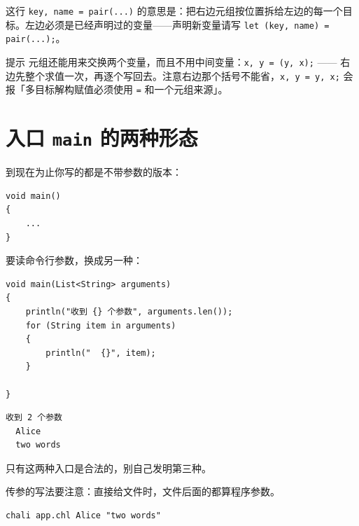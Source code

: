 这行 \texttt{key,\allowbreak{} name =\allowbreak{} pair(\allowbreak{}.\allowbreak{}.\allowbreak{}.\allowbreak{})\allowbreak{}} 的意思是：把右边元组按位置拆给左边的每一个目标。左边必须是已经声明过的变量——声明新变量请写 \texttt{let (\allowbreak{}key,\allowbreak{} name)\allowbreak{} =\allowbreak{} pair(\allowbreak{}.\allowbreak{}.\allowbreak{}.\allowbreak{})\allowbreak{};}。

\begin{tip}{提示}
元组还能用来交换两个变量，而且不用中间变量：\texttt{x,\allowbreak{} y =\allowbreak{} (\allowbreak{}y,\allowbreak{} x)\allowbreak{};} —— 右边先整个求值一次，再逐个写回去。注意右边那个括号不能省，\texttt{x,\allowbreak{} y =\allowbreak{} y,\allowbreak{} x;} 会报「多目标解构赋值必须使用 \texttt{=\allowbreak{}} 和一个元组来源」。
\end{tip}

\section{入口 \texttt{main} 的两种形态}

到现在为止你写的都是不带参数的版本：

\par
\medskip
\begin{lstlisting}[style=chali]
void main()
{
    ...
}
\end{lstlisting}
\par
\medskip

要读命令行参数，换成另一种：

\par
\medskip
\begin{lstlisting}[style=chali]
void main(List<String> arguments)
{
    println("收到 {} 个参数", arguments.len());
    for (String item in arguments)
    {
        println("  {}", item);
    }

}
\end{lstlisting}
\par
\medskip

\par
\medskip
\begin{lstlisting}[style=out]
收到 2 个参数
  Alice
  two words
\end{lstlisting}
\par
\medskip

只有这两种入口是合法的，别自己发明第三种。

传参的写法要注意：直接给文件时，文件后面的都算程序参数。

\par
\medskip
\begin{lstlisting}[style=sh]
chali app.chl Alice "two words"
\end{lstlisting}
\par
\medskip

